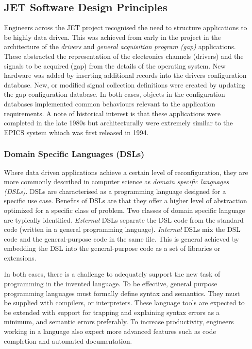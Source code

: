 \documentclass[preprint,12pt]{elsarticle}
\begin{document}
\subsection{JET Software Design Principles}

Engineers across the JET project recognised the need to structure applications to be highly data driven.
This was achieved from early in the project in the architecture of the {\em drivers} and {\em general acquisition program (gap)} applications.
These abstracted the representation of the electronics channels (drivers) and the signals to be acquired (gap) 
from the details of the operating system.  New hardware was added by inserting additional records into 
the drivers configuration database.  New, or modified signal collection definitions
were created by updating the gap configuration database.  In both cases, objects in the 
configuration databases implemented common behaviours relevant to the application requirements.
A note of historical interest is that these applications were completed in the late 1980s
but architecturally were extremely similar to the EPICS system whioch was first released in 1994.

\subsubsection{Domain Specific Languages (DSLs)}

Where data driven applications achieve a certain level of reconfiguration, they are more commonly
described in computer science as {\em domain specific languages (DSLs)}. DSLs are characterised
as a programming language designed for a specific use case.  Benefits of DSLs are that they 
offer a higher level of abstraction optimized for a specific class of problem. Two classes
of domain specific language are typically identified. {\em External} DSLs separate the DSL
code from the standard code (written in a general programming language).  {\em Internal} DSLs
mix the DSL code and the general-purpose code in the same file.  This is general achieved by
embedding the DSL into the general-purpose code as a set of libraries or extensions.

In both cases, there is a challenge to adequately support the new task of programming
in the invented language.  To be effective, general purpose programming languages must
formally define syntax and semantics. They must be supplied with compilers, or interpreters.
These language tools are expected to be extended with support for trapping and explaining
syntax errors as a minimum, and semantic errors preferably.  To increase productivity, 
engineers working in a language also expect more advanced features such as code completion
and automated documentation.
\end{document}
